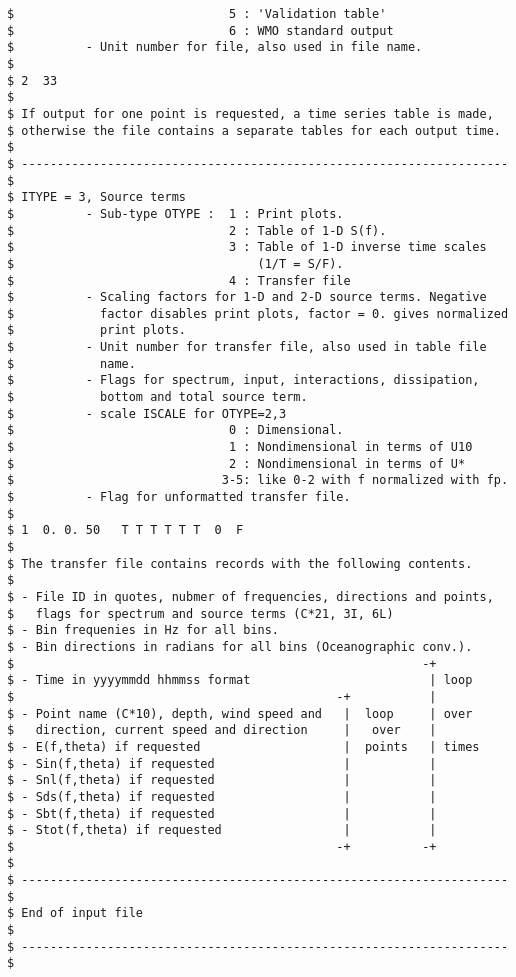 \begin{verbatim}
$                              5 : 'Validation table'
$                              6 : WMO standard output 
$          - Unit number for file, also used in file name.
$
$ 2  33
$
$ If output for one point is requested, a time series table is made,
$ otherwise the file contains a separate tables for each output time.
$
$ -------------------------------------------------------------------- $
$ ITYPE = 3, Source terms
$          - Sub-type OTYPE :  1 : Print plots.
$                              2 : Table of 1-D S(f).
$                              3 : Table of 1-D inverse time scales
$                                  (1/T = S/F).
$                              4 : Transfer file
$          - Scaling factors for 1-D and 2-D source terms. Negative
$            factor disables print plots, factor = 0. gives normalized
$            print plots.
$          - Unit number for transfer file, also used in table file
$            name.
$          - Flags for spectrum, input, interactions, dissipation,
$            bottom and total source term.
$          - scale ISCALE for OTYPE=2,3
$                              0 : Dimensional.
$                              1 : Nondimensional in terms of U10
$                              2 : Nondimensional in terms of U*
$                             3-5: like 0-2 with f normalized with fp.
$          - Flag for unformatted transfer file.
$
$ 1  0. 0. 50   T T T T T T  0  F
$
$ The transfer file contains records with the following contents.
$
$ - File ID in quotes, nubmer of frequencies, directions and points,
$   flags for spectrum and source terms (C*21, 3I, 6L)
$ - Bin frequenies in Hz for all bins.
$ - Bin directions in radians for all bins (Oceanographic conv.).
$                                                         -+
$ - Time in yyyymmdd hhmmss format                         | loop
$                                             -+           |
$ - Point name (C*10), depth, wind speed and   |  loop     | over
$   direction, current speed and direction     |   over    |
$ - E(f,theta) if requested                    |  points   | times
$ - Sin(f,theta) if requested                  |           |
$ - Snl(f,theta) if requested                  |           |
$ - Sds(f,theta) if requested                  |           |
$ - Sbt(f,theta) if requested                  |           |
$ - Stot(f,theta) if requested                 |           |
$                                             -+          -+
$
$ -------------------------------------------------------------------- $
$ End of input file                                                    $
$ -------------------------------------------------------------------- $
\end{verbatim}
